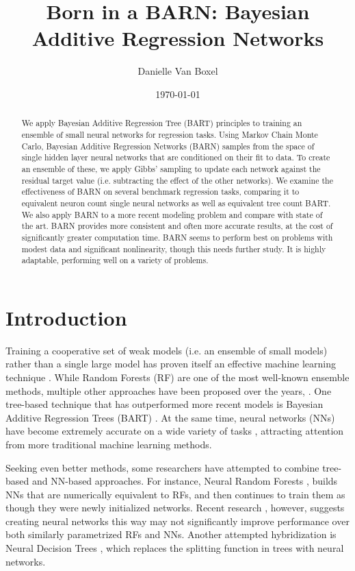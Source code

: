 \documentclass[12pt]{article}
\title{Born in a BARN: Bayesian Additive Regression Networks}
\author{Danielle Van Boxel}
\date{\today}
\begin{document}
\maketitle

\begin{abstract}

    We apply Bayesian Additive Regression Tree (BART) principles to training an ensemble of small neural networks for regression tasks.  Using Markov Chain Monte Carlo, Bayesian Additive Regression Networks (BARN) samples from the space of single hidden layer neural networks that are conditioned on their fit to data.  To create an ensemble of these, we apply Gibbs' sampling to update each network against the residual target value (i.e. subtracting the effect of the other networks).  We examine the effectiveness of BARN on several benchmark regression tasks, comparing it to equivalent neuron count single neural networks as well as equivalent tree count BART.  We also apply BARN to a more recent modeling problem and compare with state of the art.  BARN provides more consistent and often more accurate results, at the cost of significantly greater computation time.  BARN seems to perform best on problems with modest data and significant nonlinearity, though this needs further study.  It is highly adaptable, performing well on a variety of problems.
\end{abstract}

\section{Introduction}\label{sec:intro}

Training a cooperative set of weak models (i.e. an ensemble of small models) rather than a single large model has proven itself an effective machine learning technique \cite{dietterich2000ensemble,hansen1990neural,seni2010ensemble,lee2020comparing}.  While Random Forests (RF) \cite{ho1995random,breiman2001random} are one of the most well-known ensemble methods, multiple other approaches have been proposed over the years, \cite[provide some reviews]{way2012advances,dong2020survey}.  One tree-based technique that has outperformed more recent models \cite{biau2019neural} is Bayesian Additive Regression Trees (BART) \cite{chipman2010bart}.  At the same time, neural networks (NNs) have become extremely accurate on a wide variety of tasks \cite{schmidhuber2015deep}, attracting attention from more traditional machine learning methods.

Seeking even better methods, some researchers have attempted to combine tree-based and NN-based approaches.  For instance, Neural Random Forests \cite{biau2019neural}, builds NNs that are numerically equivalent to RFs, and then continues to train them as though they were newly initialized networks.  Recent research \cite{vanboxel2021neural}, however, suggests creating neural networks this way may not significantly improve performance over both similarly parametrized RFs and NNs.  Another attempted hybridization is Neural Decision Trees \cite{balestriero2017neural}, which replaces the splitting function in trees with neural networks.
\end{document}
